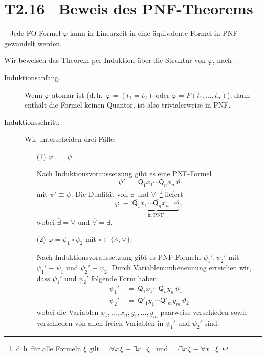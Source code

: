 \documentclass[fontsize=11pt, twoside=false, numbers=autoenddot]{scrbook}
\begin{document}
\section*{T2.16~ Beweis des PNF-Theorems}

~
Jede FO-Formel $\varphi$ kann in Linearzeit in eine äquivalente Formel in PNF gewandelt werden.
%
\begin{beweis}
  Wir beweisen das Theorem
  per Induktion über die Struktur von $\varphi$,
  nach \cite{SkriptGraedel}.
  \begin{description}
    \item[Induktionsanfang.]
      Wenn $\varphi$ atomar ist (d.\,h.\ $\varphi = (t_1 = t_2)$ oder $\varphi = P(t_1,\dots,t_n)$),
      dann enthält die Formel keinen Quantor, ist also trivialerweise in PNF.
    \item[Induktionsschritt.]
      Wir unterscheiden drei Fälle:
      \begin{enumerate}
        \item[(1)]
          $\varphi = \lnot \psi$.
          \par\smallskip
          Nach Induktionsvoraussetzung gibt es eine PNF-Formel
          \[
            \psi' ~=~ \textsf{Q}_1x_1 \cdots \textsf{Q}_nx_n\, \vartheta
          \]
          mit $\psi' \equiv \psi$.
          Die Dualität von $\exists$ und $\forall$\,%
          \footnote{%
            d.\,h\, für alle Formeln $\xi$ gilt
            ~$\lnot \forall x\,\xi \equiv \exists x\, \lnot \xi$~
            und 
            ~$\lnot \exists x\,\xi \equiv \forall x\, \lnot \xi$~
          }
          liefert
          \[
            \varphi ~\equiv~ \underbrace{\overline{\textsf{Q}_1} x_1 \cdots \overline{\textsf{Q}_n} x_n\, \lnot \vartheta}_{\text{in PNF}}\,,
          \]
          wobei $\overline{\exists} = \forall$ und $\overline{\forall} = \exists$.
          \pagebreak
          \par\smallskip
        \item[(2)]
          $\varphi = \psi_1 \circ \psi_2$ mit $\circ \in \{\land,\lor\}$.
          \par\smallskip
          Nach Induktionsvoraussetzung gibt es PNF-Formeln
          $\psi_1',\psi_2'$ mit $\psi_1' \equiv \psi_1$ und $\psi_2' \equiv \psi_2$.
          Durch Variablenumbenennung erreichen wir,
          dass $\psi_1'$ und $\psi_2'$ folgende Form haben:
          \begin{align*}
            \psi_1' & ~=~ \textsf{Q}_1  x_1 \cdots \textsf{Q}_n  y_n \, \vartheta_1 \\
            \psi_2' & ~=~ \textsf{Q}'_1 y_1 \cdots \textsf{Q}'_m y_m \, \vartheta_2
          \end{align*}
          wobei die Variablen $x_1,\dots,x_n,y_1,\dots,y_m$ paarweise verschieden
          sowie verschieden von allen freien Variablen in $\psi_1'$ und $\psi_2'$ sind.


\end{enumerate}
\end{description}
\end{beweis}
\end{document}
